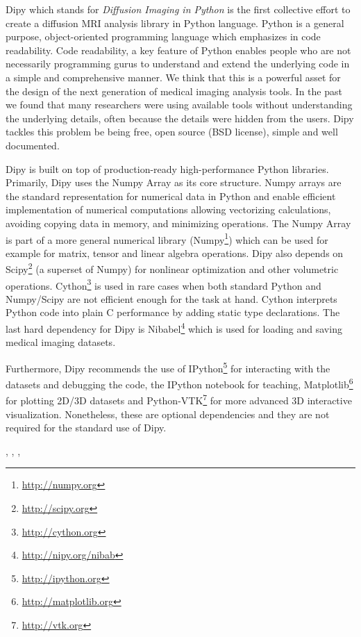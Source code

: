 \documentclass{bioinfo}
\begin{document}
Dipy which stands for \textit{Diffusion Imaging in Python} is the first collective effort to create a diffusion MRI analysis library in Python language. Python is a general purpose, object-oriented programming language which emphasizes in code readability. Code readability, a key feature of Python enables people who are not necessarily programming gurus to understand and extend the underlying code in a simple and comprehensive manner. We think that this is a powerful asset for the design of the next generation of medical imaging analysis tools. In the past we found that many researchers were using available tools without understanding the underlying details, often because the details were hidden from the users. Dipy tackles this problem be being free, open source (BSD license), simple and well documented. 

Dipy is built on top of production-ready high-performance Python libraries. Primarily, Dipy uses the Numpy Array \citep{van_numpy:11} as its core structure. Numpy arrays are the standard representation for numerical data in Python and enable efficient implementation of numerical computations allowing vectorizing calculations, avoiding copying data in memory, and minimizing operations. The Numpy Array is part of a more general numerical library (Numpy\footnote{\url{http://numpy.org}}) which can be used for example for matrix, tensor and linear algebra operations. Dipy also depends on Scipy\footnote{\url{http://scipy.org}} (a superset of Numpy) for nonlinear optimization and other volumetric operations. Cython\footnote{\url{http://cython.org}} is used in rare cases when both standard Python and Numpy/Scipy are not efficient enough for the task at hand. Cython interprets Python code into plain C performance by adding static type declarations. The last hard dependency for Dipy is Nibabel\footnote{\url{http://nipy.org/nibab}} which is used for loading and saving medical imaging datasets.

Furthermore, Dipy recommends the use of IPython\footnote{\url{http://ipython.org}} for interacting with the datasets and debugging the code, the IPython notebook for teaching, Matplotlib\footnote{\url{http://matplotlib.org}} for plotting 2D/3D datasets and Python-VTK\footnote{\url{http://vtk.org}} for more advanced 3D interactive visualization. Nonetheless, these are optional dependencies and they are not required for the standard use of Dipy.

\citep{perez_ipython:07}, \citep{perez_python:11}, \citep{mckinney_python:12}, 
\end{document}
